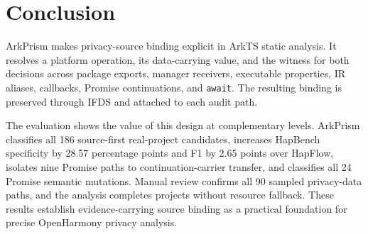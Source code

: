\section{Conclusion}
\label{sec:conclusion}

ArkPrism makes privacy-source binding explicit in ArkTS static analysis. It resolves a platform operation, its data-carrying value, and the witness for both decisions across package exports, manager receivers, executable properties, IR aliases, callbacks, Promise continuations, and \texttt{await}. The resulting binding is preserved through IFDS and attached to each audit path.

The evaluation shows the value of this design at complementary levels. ArkPrism classifies all 186 source-first real-project candidates, increases HapBench specificity by 28.57 percentage points and F1 by 2.65 points over HapFlow, isolates nine Promise paths to continuation-carrier transfer, and classifies all 24 Promise semantic mutations. Manual review confirms all 90 sampled privacy-data paths, and the analysis completes \CorpusProjects{} projects without resource fallback. These results establish evidence-carrying source binding as a practical foundation for precise OpenHarmony privacy analysis.
